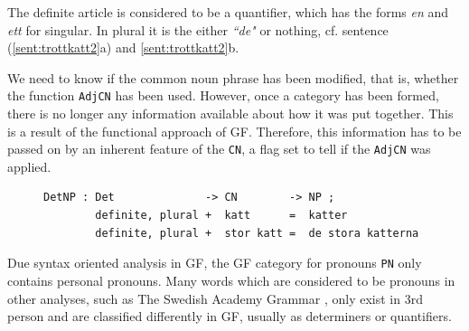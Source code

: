 \documentclass{report}
\begin{document}
The definite article is considered to be a quantifier, which has the forms
\emph{en} and \emph{ett} for singular. In plural it
is the either \emph{``de"} or nothing, cf. sentence (\ref{sent:trottkatt2}a) and
\ref{sent:trottkatt2}b.
\label{sent:trottkatt2}

We need to know if the common noun phrase 
has been modified, that is, whether the function \verb_AdjCN_ has been used.
However, once a category has been formed, there is no longer any information available
about how it was put together. This is a result of the functional approach
of GF. Therefore, %
this information
has to be passed on by an inherent feature of the \verb-CN-, a flag set to tell
if the \verb-AdjCN- was applied.
\begin{figure}[h]
\begin{verbatim}
DetNP : Det              -> CN        -> NP ;
        definite, plural +  katt      =  katter
        definite, plural +  stor katt =  de stora katterna
\end{verbatim}        
\caption{}\label{gfcode:defmod}
\end{figure}


Due syntax oriented analysis in GF, the GF category for pronouns \verb-PN- only
contains personal pronouns.
Many words which are considered to be pronouns in other analyses, such as The Swedish
Academy Grammar \cite{SAG}, only exist in 3rd person and are 
classified differently in GF, usually as determiners or quantifiers.

\end{document}
